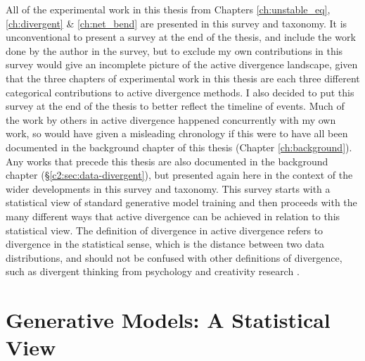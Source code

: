 All of the experimental work in this thesis from Chapters \ref{ch:unstable_eq}, \ref{ch:divergent} \& \ref{ch:net_bend} are presented in this survey and taxonomy.
It is unconventional to present a survey at the end of the thesis, and include the work done by the author in the survey, but to exclude my own contributions in this survey would give an incomplete picture of the active divergence landscape, given that the three chapters of experimental work in this thesis are each three different categorical contributions to active divergence methods.
I also decided to put this survey at the end of the thesis to better reflect the timeline of events.
Much of the work by others in active divergence happened concurrently with my own work, so would have given a misleading chronology if this were to have all been documented in the background chapter of this thesis (Chapter \ref{ch:background}). 
Any works that precede this thesis are also documented in the background chapter (\S \ref{c2:sec:data-divergent}), but presented again here in the context of the wider developments in this survey and taxonomy. 
This survey starts with a statistical view of standard generative model training and then proceeds with the many different ways that active divergence can be achieved in relation to this statistical view.
The definition of divergence in active divergence refers to divergence in the statistical sense, which is the distance between two data distributions, and should not be confused with other definitions of divergence, such as divergent thinking from psychology and creativity research \citep{guilford1957creative}.

\section{Generative Models: A Statistical View}

